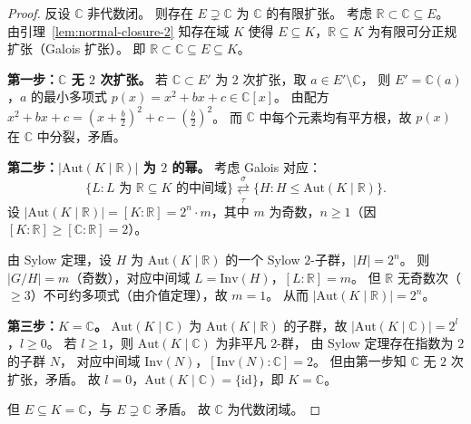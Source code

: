 \documentclass[lang=cn,a4paper,newtx]{elegantbook}
\begin{document}
\begin{proof}
  反设 $\mathbb{C}$ 非代数闭。
  则存在 $E\supsetneq\mathbb{C}$ 为 $\mathbb{C}$ 的有限扩张。
  考虑 $\mathbb{R}\subset\mathbb{C}\subseteq E$。
  由引理~\ref{lem:normal-closure-2} 知存在域 $K$ 使得 $E\subseteq K$，$\mathbb{R}\subseteq K$ 为有限可分正规扩张（Galois 扩张）。
  即 $\mathbb{R}\subset\mathbb{C}\subseteq E\subseteq K$。

  \textbf{第一步：$\mathbb{C}$ 无 $2$ 次扩张。}
  若 $\mathbb{C}\subset E'$ 为 $2$ 次扩张，取 $a\in E'\setminus\mathbb{C}$，
  则 $E'=\mathbb{C}(a)$，$a$ 的最小多项式 $p(x)=x^2+bx+c\in\mathbb{C}[x]$。
  由配方 $x^2+bx+c=(x+\tfrac{b}{2})^2+c-(\tfrac{b}{2})^2$。
  而 $\mathbb{C}$ 中每个元素均有平方根，故 $p(x)$ 在 $\mathbb{C}$ 中分裂，矛盾。

  \textbf{第二步：$|\mathrm{Aut}(K\mid\mathbb{R})|$ 为 $2$ 的幂。}
  考虑 Galois 对应：
  \[
    \{L:L\text{ 为 }\mathbb{R}\subseteq K\text{ 的中间域}\}
    \overset{\sigma}{\underset{\tau}{\rightleftarrows}}
    \{H:H\le\mathrm{Aut}(K\mid\mathbb{R})\}.
  \]
  设 $|\mathrm{Aut}(K\mid\mathbb{R})|=[K:\mathbb{R}]=2^n\cdot m$，其中 $m$ 为奇数，$n\ge 1$（因 $[K:\mathbb{R}]\ge[\mathbb{C}:\mathbb{R}]=2$）。

  由 Sylow 定理，设 $H$ 为 $\mathrm{Aut}(K\mid\mathbb{R})$ 的一个 Sylow $2$-子群，$|H|=2^n$。
  则 $|G/H|=m$（奇数），对应中间域 $L=\mathrm{Inv}(H)$，$[L:\mathbb{R}]=m$。
  但 $\mathbb{R}$ 无奇数次（$\ge 3$）不可约多项式（由介值定理），故 $m=1$。
  从而 $|\mathrm{Aut}(K\mid\mathbb{R})|=2^n$。

  \textbf{第三步：$K=\mathbb{C}$。}
  $\mathrm{Aut}(K\mid\mathbb{C})$ 为 $\mathrm{Aut}(K\mid\mathbb{R})$ 的子群，故 $|\mathrm{Aut}(K\mid\mathbb{C})|=2^l$，$l\ge 0$。
  若 $l\ge 1$，则 $\mathrm{Aut}(K\mid\mathbb{C})$ 为非平凡 $2$-群，
  由 Sylow 定理存在指数为 $2$ 的子群 $N$，
  对应中间域 $\mathrm{Inv}(N)$，$[\mathrm{Inv}(N):\mathbb{C}]=2$。
  但由第一步知 $\mathbb{C}$ 无 $2$ 次扩张，矛盾。
  故 $l=0$，$\mathrm{Aut}(K\mid\mathbb{C})=\{\mathrm{id}\}$，即 $K=\mathbb{C}$。

  但 $E\subseteq K=\mathbb{C}$，与 $E\supsetneq\mathbb{C}$ 矛盾。
  故 $\mathbb{C}$ 为代数闭域。
\end{proof}
\end{document}
